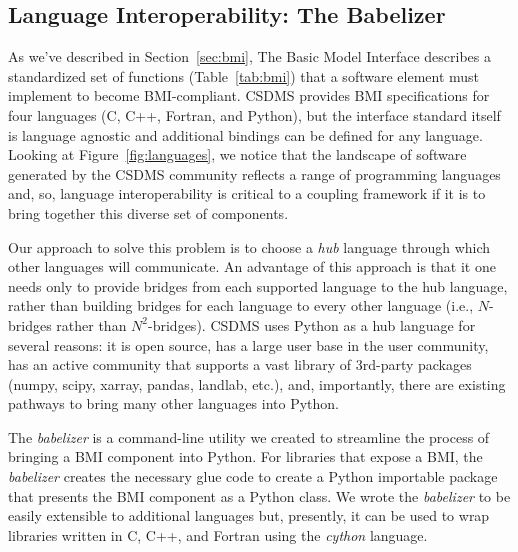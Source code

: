 \documentclass[12pt]{amsart}
\begin{document}
\subsection{Language Interoperability: The Babelizer}
\label{sec:babelizer}

As we've described in Section~\ref{sec:bmi}, The Basic Model Interface describes
a standardized set of functions (Table~\ref{tab:bmi}) that a software element must
implement to become BMI-compliant. CSDMS provides BMI
specifications for four languages (C, C++, Fortran, and Python), but the
interface standard itself is language agnostic and additional bindings
can be defined for any language. Looking at Figure~\ref{fig:languages},
we notice that the landscape of software generated by the CSDMS community
reflects a range of programming languages and, so, language interoperability is critical
to a coupling framework if it is to bring together this diverse set of components.

Our approach to solve this problem is to choose a \textit{hub} language through
which other languages will communicate. An advantage of this approach is that
it one needs only to provide bridges from each supported language to the hub
language, rather than building bridges for each language to every
other language (i.e., $N$-bridges rather than $N^2$-bridges). CSDMS uses Python as a hub language for several reasons: it is open source, has a large user
base in the user community, has an active community that supports a vast library
of 3rd-party packages (numpy, scipy, xarray, pandas, landlab, etc.), and,
importantly, there are existing pathways to bring many other languages into Python.

The \textit{babelizer} is a command-line utility we created to streamline the
process of bringing a BMI component into Python. For libraries that expose a
BMI, the \textit{babelizer} creates the necessary glue code to create a Python
importable package that presents the BMI component as a Python class. We
wrote the \textit{babelizer} to be easily extensible to additional languages but,
presently, it can be used to wrap libraries written in C, C++, and Fortran
using the \textit{cython} language.




\end{document}
